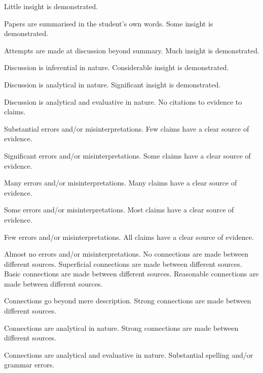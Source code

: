 \documentclass{../../fal_assignment}
\begin{document}
\begin{markingrubric}
        \grade		Little insight is demonstrated.
        \par		Papers are summarised in the student's own words.
        \grade		Some insight is demonstrated.
        \par		Attempts are made at discussion beyond summary.
        \grade		Much insight is demonstrated.
        \par		Discussion is inferential in nature.
        \grade		Considerable insight is demonstrated.
        \par		Discussion is analytical in nature.
        \grade		Significant insight is demonstrated.
        \par		Discussion is analytical and evaluative in nature.
%
        \grade\fail 	No citations to evidence to claims.
        \par 		Substantial errors and/or misinterpretations.
        \grade 		Few claims have a clear source of evidence.
        \par 		Significant errors and/or misinterpretations.
        \grade 		Some claims have a clear source of evidence.
        \par 		Many errors and/or misinterpretations.
        \grade 		Many claims have a clear source of evidence.
        \par 		Some errors and/or misinterpretations.
        \grade 		Most claims have a clear source of evidence.
        \par 		Few errors and/or misinterpretations.
        \grade 		All claims have a clear source of evidence.
        \par 		Almost no errors and/or misinterpretations.
%
        \grade\fail No connections are made between different sources.
        \grade		Superficial connections are made between different sources.
        \grade		Basic connections are made between different sources.
        \grade		Reasonable connections are made between different sources.
        \par		Connections go beyond mere description.
        \grade		Strong connections are made between different sources.
        \par		Connections are analytical in nature.
        \grade		Strong connections are made between different sources.
        \par		Connections are analytical and evaluative in nature.
%
        \grade\fail 	Substantial spelling and/or grammar errors.

\end{markingrubric}
\end{document}
